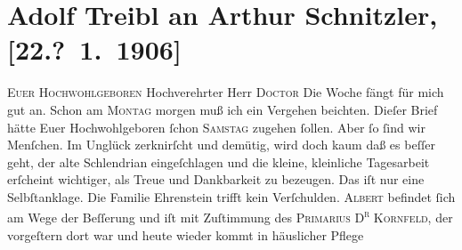 

         
         \renewcommand{\erwaehntePersonen}{Personen: Alexander Ehrenstein, Charlotte Ehrenstein, Albert Ehrenstein, Johann Gottfried von Herder, Sigmund Kornfeld}
         \renewcommand{\erwaehnteOrte}{Orte: Wien}
         \renewcommand{\erwaehnteWerke}{}
               \section[Adolf Treibl an Arthur Schnitzler, {[}22.? 1. 1906{]}]{ Adolf Treibl an Arthur Schnitzler, {[}22.? 1. 1906{]}}\nopagebreak{}\rehead{ }\begin{ledgroupsized}[t]{13cm}\normalsize\beginnumbering \toendnotes[C]{\smallbreak\pagebreak[2]} 
\toendnotes[C]{\smallbreak}\pstart
           \noindent{}{\pb}\textsc{Euer Hochwohlgeboren}\pend
           \pstart{}Hochverehrter Herr \textsc{Doctor}\pend\pstart
           Die Woche fängt für mich gut an. Schon am \textsc{Montag}{ }morgen muß ich ein Vergehen beichten. Dieſer Brief hätte Euer
                    Hochwohlgeboren ſchon \textsc{Samstag} zugehen ſollen. Aber ſo ſind wir Menſchen. Im Unglück zerknirſcht und
                    demütig, wird doch {\pb}kaum daß es beſſer geht, der
                    alte Schlendrian eingeſchlagen und die kleine, kleinliche Tagesarbeit erſcheint
                    wichtiger, als Treue und Dankbarkeit zu bezeugen. Das iſt nur eine
                    Selbſtanklage. Die Familie Ehrenstein
                    trifft kein Verſchulden.\pend
           \pstart
           \textsc{Albert} befindet ſich am Wege der Beſſerung und iſt mit Zuſtimmung des \textsc{Prima{\pb}rius D\textsuperscript{r}}{ }\textsc{Kornfeld}, der vorgeſtern dort war und heute wieder kommt in häuslicher Pflege

\end{ledgroupsized}
